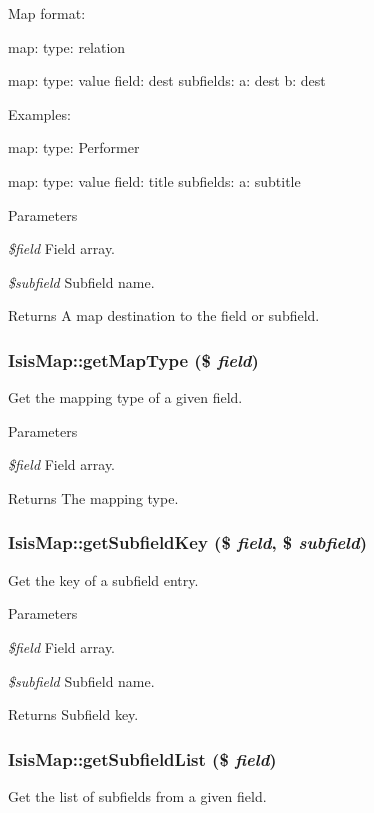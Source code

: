 Map format:

map: type: relation

map: type: value field: dest subfields: a: dest b: dest

Examples:

map: type: Performer

map: type: value field: title subfields: a: subtitle


\begin{DoxyParams}{Parameters}
\item[{\em \$field}]Field array.\item[{\em \$subfield}]Subfield name.\end{DoxyParams}
\begin{DoxyReturn}{Returns}
A map destination to the field or subfield. 
\end{DoxyReturn}
\hypertarget{classIsisMap_a62b933be483fb6704e12e41f10286cd5}{
\subsubsection[{getMapType}]{\setlength{\rightskip}{0pt plus 5cm}IsisMap::getMapType (\$ {\em field})}}
\label{classIsisMap_a62b933be483fb6704e12e41f10286cd5}
Get the mapping type of a given field.


\begin{DoxyParams}{Parameters}
\item[{\em \$field}]Field array.\end{DoxyParams}
\begin{DoxyReturn}{Returns}
The mapping type. 
\end{DoxyReturn}
\hypertarget{classIsisMap_ae5d904b8407b38751656715fb9efd7cf}{
\subsubsection[{getSubfieldKey}]{\setlength{\rightskip}{0pt plus 5cm}IsisMap::getSubfieldKey (\$ {\em field}, \/  \$ {\em subfield})}}
\label{classIsisMap_ae5d904b8407b38751656715fb9efd7cf}
Get the key of a subfield entry.


\begin{DoxyParams}{Parameters}
\item[{\em \$field}]Field array.\item[{\em \$subfield}]Subfield name.\end{DoxyParams}
\begin{DoxyReturn}{Returns}
Subfield key. 
\end{DoxyReturn}
\hypertarget{classIsisMap_ad0b61ec2fbfb011db4bf89c5f54efab4}{
\subsubsection[{getSubfieldList}]{\setlength{\rightskip}{0pt plus 5cm}IsisMap::getSubfieldList (\$ {\em field})}}
\label{classIsisMap_ad0b61ec2fbfb011db4bf89c5f54efab4}
Get the list of subfields from a given field.


